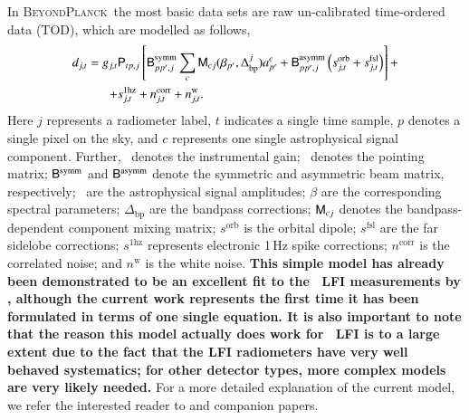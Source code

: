 \documentclass[twocolumn]{aa}
\renewcommand{\a}[0]{\vec{a}}
\newcommand{\B}[0]{\tens{B}}
\newcommand{\g}[0]{\vec{g}}
\newcommand{\M}[0]{\tens{M}}
\renewcommand{\P}[0]{\tens{P}}
\newcommand{\Dbp}[0]{\Delta_{\mathrm{bp}}}
\newcommand{\BP}{\textsc{BeyondPlanck}}
\begin{document}
In \BP\, the most basic data sets are raw un-calibrated time-ordered
data (TOD), which are modelled as follows,
\begin{equation}
  \begin{split}
    d_{j,t} = g_{j,t}&\P_{tp,j}\left[\B^{\mathrm{symm}}_{pp',j}\sum_{c}
      \M_{cj}(\beta_{p'}, \Dbp^{j})a^c_{p'}  + \B^{\mathrm{asymm}}_{pp',j}\left(s^{\mathrm{orb}}_{j,t}  
      + s^{\mathrm{fsl}}_{j,t}\right)\right] + \\
    + &s^{\mathrm{1hz}}_{j,t} + n^{\mathrm{corr}}_{j,t} + n^{\mathrm{w}}_{j,t}.
  \end{split}
  \label{eq:todmodel}
\end{equation}
Here $j$ represents a radiometer label, $t$ indicates a single time
sample, $p$ denotes a single pixel on the sky, and $c$ represents one
single astrophysical signal component. Further, \g\ denotes the
instrumental gain; \P\ denotes the pointing matrix;
$\B^{\mathrm{symm}}$ and $\B^{\mathrm{asymm}}$ denote the symmetric
and asymmetric beam matrix, respectively; \a\ are the astrophysical
signal amplitudes; $\beta$ are the corresponding spectral parameters;
$\Dbp$ are the bandpass corrections; $\M_{cj}$ denotes the
bandpass-dependent component mixing matrix; $s^{\mathrm{orb}}$ is the
orbital dipole; $s^{\mathrm{fsl}}$ are the far sidelobe corrections;
$s^{\mathrm{1hz}}$ represents electronic 1\,Hz spike corrections;
$n^{\mathrm{corr}}$ is the correlated noise; and $n^{\mathrm{w}}$ is
the white noise. \textbf{This simple model has already been
  demonstrated to be an excellent fit to the \Planck\ LFI measurements
  by
  \citet{planck2013-p02,planck2014-a03,planck2014-a12,planck2016-l02},
  although the current work represents the first time it has been
  formulated in terms of one single equation. It is also important to
  note that the reason this model actually does work for \Planck\ LFI
  is to a large extent due to the fact that the LFI radiometers have
  very well behaved systematics; for other detector types, more
  complex models are very likely needed.} For a more detailed
explanation of the current model, we refer the interested reader to
\citet{bp01} and companion papers.
\end{document}
